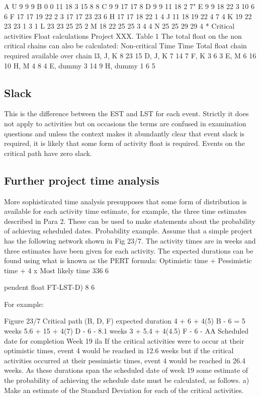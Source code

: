 \documentclass[]{report}
\begin{document}
A U 9 9 9 
B 0 0 11 18 3 15 8 8 
C 9 9 17 17 8 
D 9 9 11 18 2 7" 
E 9 9 18 22 3 10 6 6 
F 17 17 19 22 2 3 17 17 23 23 6 
H 17 17 18 22 1 4 
J 11 18 19 22 4 7 4 
K 19 22 23 23 1 3 1 
L 23 23 25 25 2 
M 18 22 25 25 3 4 4 
N 25 25 29 29 4 
* Critical activities Float calculations Project XXX. Table 1 The total float on the non critical chains can also be calculated: Non-critical Time Time Total float chain required available over chain l3, J, K 8 23 15 D, J, K 7 14 7 F, K 3 6 3 E, M 6 16 10 H, M 4 8 4 E, dummy 3 14 9 H, dummy 1 6 5 

\subsection{Slack} %
This is the difference between the EST and LST for each event. Strictly it does not apply to activities but on occasions the terms are confused in 
examination questions and unless the context makes it abundantly clear that event slack is required, it is likely that some form of activity float is required. 
Events on the critical path have zero slack.
\subsection{Further project time analysis} 
More sophisticated time analysis presupposes that some form of distribution is 
available for each activity time estimate, for example, the three time estimates described in Para 2. These can be used to make statements about the 
probability of achieving scheduled dates. Probability example. Assume that a simple project has the following network shown in Fig 23/7. 
The activity times are in weeks and three estimates have been given for each activity. The expected durations can be found using what is known as 
the PERT formula: Optimistic time + Pessimistic time + 4 x Most likely time 
336 
6 

pendent float FT-LST-D) 
8 
6 

For example: 

Figure 23/7 Critical path (B, D, F) expected duration 4 + 6 + 4(5) B - 6 = 5 weeks 
5.6 + 15 + 4(7) D - 6 - 8.1 weeks 
3 + 5.4 + 4(4.5) F -  6 - AA 
Scheduled date for completion Week 19 
ila If the critical activities were to occur at their optimistic times, event 4 would be reached in 12.6 weeks but if the critical activities occurred at their pessimistic times, event 4 would be reached in 26.4 weeks. As these durations span the scheduled date of week 19 some estimate of the probability of achieving the schedule date must be calculated, as follows. 
a) Make an estimate of the Standard Deviation for each of the critical activities.
\end{document}
